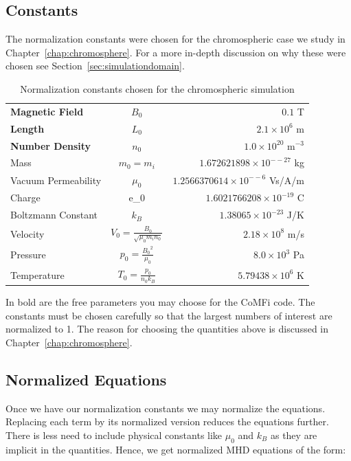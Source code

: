\documentclass[12pt,upcase]{umlthesis}
\begin{document}
\subsection{Constants}\label{sec:normconstants}

The normalization constants were chosen for the chromospheric case we study in Chapter~\ref{chap:chromosphere}. For a more in-depth discussion on why these were chosen see Section~\ref{sec:simulationdomain}.

\begin{table}[h]\label{tab:normalization}
\centering
\caption[Normalization Constants]{Normalization constants chosen for the chromospheric simulation}
\begin{tabular}[]{l  c  r}
	\toprule
	\textbf{Magnetic Field} & $B_0$ & $0.1$ T\\
	\textbf{Length} & $L_0$ & $2.1 \times 10^6$ m \\
	\textbf{Number Density} & $n_0$ & $1.0\times 10^{20}$ m$^{-3}$ \\
	Mass & $m_0 = m_i$ & $1.672621898\times 10^{-−27}$ kg \\
	Vacuum Permeability & $\mu_0$ & $1.2566370614\times 10^{-−6}$ Vs/A/m \\
	Charge & e_0 & $1.6021766208\times10^{-19}$ C \\
	Boltzmann Constant & $k_B$ & $1.38065\times10^{-23}$ J/K\\
	Velocity & $V_0=\frac{B_0}{\sqrt{\mu_0 m_i n_0}}$ & $2.18 \times 10^{8}$ m/s\\
	Pressure & $p_0= \frac{{B_0}^2}{\mu_0}$ & $8.0 \times 10^3$ Pa \\
	Temperature & $T_0 = \frac{p_0}{n_0 k_B} $ & $5.79438\times10^6$ K\\
	\bottomrule
\end{tabular}
\end{table}

In bold are the free parameters you may choose for the CoMFi code. The constants must be chosen carefully so that the largest numbers of interest are normalized to 1. The reason for choosing the quantities above is discussed in Chapter~\ref{chap:chromosphere}.

\subsection{Normalized Equations}\label{sec:normequations}

Once we have our normalization constants we may normalize the equations. Replacing each term by its normalized version reduces the equations further. There is less need to include physical constants like $\mu_0$ and $k_B$ as they are implicit in the quantities. Hence, we get normalized MHD equations of the form:
\end{document}
